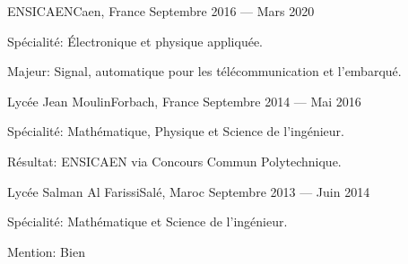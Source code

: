 
    {ENSICAEN}{Caen, France}
    {Septembre 2016 --- Mars 2020}
    {\begin{additems}
        \item Spécialité: Électronique et physique appliquée.
        \item Majeur: Signal, automatique pour les télécommunication et l'embarqué.
    \end{additems}}

    {Lycée Jean Moulin}{Forbach, France}
    {Septembre 2014 --- Mai 2016}
    {\begin{additems}
        \item Spécialité: Mathématique, Physique et Science de l'ingénieur.
        \item Résultat: ENSICAEN via Concours Commun Polytechnique.
    \end{additems}}

    {Lycée Salman Al Farissi}{Salé, Maroc}
    {Septembre 2013 --- Juin 2014}
    {\begin{additems}
        \item Spécialité: Mathématique et Science de l'ingénieur.
        \item Mention: Bien
    \end{additems}}
